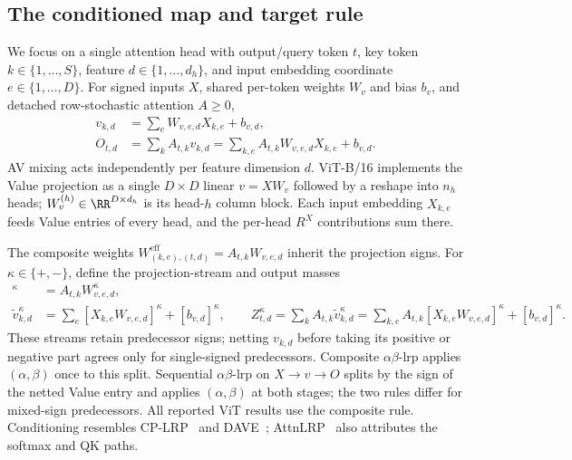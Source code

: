 \subsection{The conditioned map and target rule}\label{ptnb:app:attention-kl-routing}\label{ptnb:app:attention-target-rule}

We focus on a single attention head with output/query token $t$, key token $k\in\{1,\dots,S\}$, feature $d\in\{1,\dots,d_h\}$, and input embedding coordinate $e\in\{1,\dots,D\}$. For signed inputs $X$, shared per-token weights $W_v$ and bias $b_v$, and detached row-stochastic attention $A\ge0$,
\begin{align}
    v_{k,d}&=\sum_e W_{v,e,d}X_{k,e}+b_{v,d},\label{ptnb:eq:attn-V-forward}\\
    O_{t,d}&=\sum_k A_{t,k}v_{k,d}
      =\sum_{k,e}A_{t,k}W_{v,e,d}X_{k,e}+b_{v,d}.\label{ptnb:eq:attn-AV-forward}
\end{align}
AV mixing acts independently per feature dimension $d$. ViT-B/16 implements the Value projection as a single $D\times D$ linear $v=XW_v$ followed by a reshape into $n_h$ heads; $W_v^{(h)}\in\RR^{D\times d_h}$ is its head-$h$ column block. Each input embedding $X_{k,e}$ feeds Value entries of every head, and the per-head $R^X$ contributions sum there.

The composite weights $W^{\mathrm{eff}}_{(k,e),(t,d)}=A_{t,k}W_{v,e,d}$ inherit the projection signs. For $\kappa\in\{+,-\}$, define the projection-stream and output masses
\begin{align}
    [W^{\mathrm{eff}}_{(k,e),(t,d)}]^\kappa
      &=A_{t,k}W_{v,e,d}^\kappa,\label{ptnb:eq:attn-composite-weight}\\
    \tilde v_{k,d}^\kappa&=\sum_e[X_{k,e}W_{v,e,d}]^\kappa+[b_{v,d}]^\kappa,
    \qquad
    Z_{t,d}^\kappa=\sum_k A_{t,k}\tilde v_{k,d}^\kappa
      =\sum_{k,e}A_{t,k}[X_{k,e}W_{v,e,d}]^\kappa+[b_{v,d}]^\kappa.
      \label{ptnb:eq:attn-Z-def}
\end{align}
These streams retain predecessor signs; netting $v_{k,d}$ before taking its positive or negative part agrees only for single-signed predecessors. Composite $\alpha\beta$-\ac{lrp} applies $(\alpha,\beta)$ once to this split. Sequential $\alpha\beta$-\ac{lrp} on $X\to v\to O$ splits by the sign of the netted Value entry and applies $(\alpha,\beta)$ at both stages; the two rules differ for mixed-sign predecessors. All reported ViT results use the composite rule. Conditioning resembles CP-LRP~\parencite{Ali2022AttnLRP} and DAVE~\parencite{Wrobel2024}; AttnLRP~\parencite{Achtibat2024AttnLRP} also attributes the softmax and QK paths.

